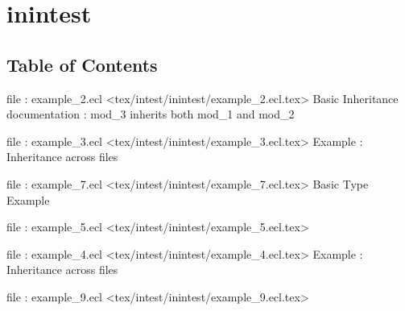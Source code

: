 \chapter*{inintest}


\section*{Table of Contents}
\par
file : example\_2.ecl <tex/intest/inintest/example\_2.ecl.tex>  Basic Inheritance documentation : mod\_3 inherits both mod\_1 and mod\_2

\par
file : example\_3.ecl <tex/intest/inintest/example\_3.ecl.tex>  Example : Inheritance across files

\par
file : example\_7.ecl <tex/intest/inintest/example\_7.ecl.tex>  Basic Type Example

\par
file : example\_5.ecl <tex/intest/inintest/example\_5.ecl.tex>  

\par
file : example\_4.ecl <tex/intest/inintest/example\_4.ecl.tex>  Example : Inheritance across files

\par
file : example\_9.ecl <tex/intest/inintest/example\_9.ecl.tex>  








